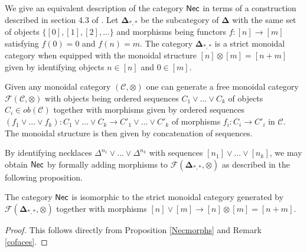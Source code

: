 We give an equivalent description of the category $\mathsf{Nec}$ in terms of a construction described in section 4.3 of \cite{Galvez-Carillo, Kaufmann, Tonks}. Let $\mathbf{\Delta}_{*,*}$ be the subcategory of $\mathbf{\Delta}$ with the same set of objects $\{ [0], [1], [2],...\}$ and morphisms being functors $f: [n] \to [m]$ satisfying $f(0)=0$ and $f(n)=m$. The category $\mathbf{\Delta}_{*,*}$ is a strict monoidal category when equipped with the monoidal structure $[n] \otimes [m]= [n+m]$ given by identifying objects $n \in [n]$ and $0 \in [m]$.

Given any monoidal category $(\mathcal{C}, \otimes)$ one can generate a free monoidal category $\mathcal{F}(\mathcal{C}, \otimes)$ with objects being ordered sequences $C_1 \vee ... \vee C_k$ of objects $C_i \in ob(\mathcal{C})$ together with morphisms given by ordered sequences $(f_1 \vee ... \vee f_k): C_1 \vee ... \vee C_k \to C'_1 \vee ... \vee C'_k$ of morphisms $f_i: C_i \to C'_i$ in $\mathcal{C}.$ The monoidal structure is then given by concatenation of sequences. 

By identifying necklaces $\Delta^{n_1} \vee ... \vee \Delta^{n_k}$ with sequences $[n_1] \vee ... \vee [n_k]$,
we may obtain $\mathsf{Nec}$ by formally adding morphisms to $\mathcal{F}( \mathbf{\Delta}_{*,*}, \otimes)$ as described in the following proposition. 

\begin{proposition}\label{freecat}
The category $\mathsf{Nec}$ is isomorphic to the strict monoidal category generated by $\mathcal{F}(\mathbf{\Delta}_{*,*}, \otimes)$ together with morphisms $[n] \vee [m] \to [n] \otimes [m]=[n+m]$.
\end{proposition}
\begin{proof}
This follows directly from Proposition \ref{Necmorphs} and Remark \ref{cofaces}.
\end{proof}


